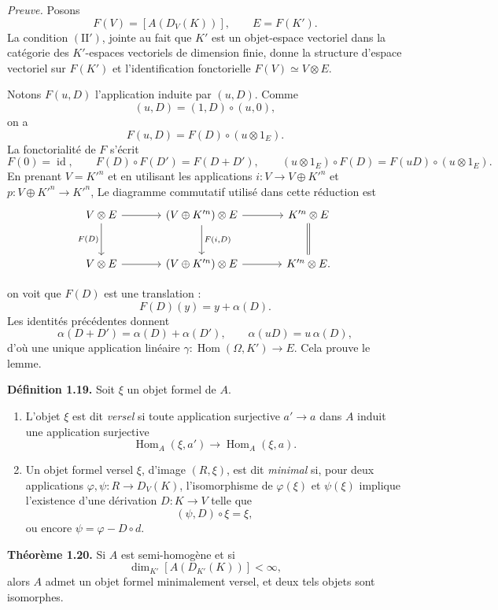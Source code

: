 \documentclass[11pt]{article}
\providecommand{\Hom}{\operatorname{Hom}}
\begin{document}
\emph{Preuve.} Posons
\[
 F(V)=[A(D_V(K))],\qquad E=F(K').
\]
La condition \((\mathrm{II}')\), jointe au fait que \(K'\) est un objet-espace vectoriel dans
la cat\'egorie des \(K'\)-espaces vectoriels de dimension finie, donne la structure d'espace
vectoriel sur \(F(K')\) et l'identification fonctorielle \(F(V)\simeq V\otimes E\).

Notons \(F(u,D)\) l'application induite par \((u,D)\). Comme
\[
 (u,D)=(1,D)\circ(u,0),
\]
on a
\[
 F(u,D)=F(D)\circ(u\otimes 1_E).
\]
La fonctorialit\'e de \(F\) s'\'ecrit
\[
 F(0)=\operatorname{id},\qquad
 F(D)\circ F(D')=F(D+D'),\qquad
 (u\otimes 1_E)\circ F(D)=F(uD)\circ(u\otimes 1_E).
\]
En prenant \(V=K'^n\) et en utilisant les applications \(i:V\to V\oplus K'^n\) et
\(p:V\oplus K'^n\to K'^n\),
Le diagramme commutatif utilis\'e dans cette r\'eduction est
\[
\begin{tikzcd}[column sep=large,row sep=large]
V\otimes E \arrow[r] \arrow[d,"F(D)"'] &
(V\oplus K'^n)\otimes E \arrow[r] \arrow[d,"{F(i,D)}"] &
K'^n\otimes E \arrow[d,equal]\\
V\otimes E \arrow[r] &
(V\oplus K'^n)\otimes E \arrow[r] &
K'^n\otimes E .
\end{tikzcd}
\]

 on voit que \(F(D)\) est une translation :
\[
 F(D)(y)=y+\alpha(D).
\]
Les identit\'es pr\'ec\'edentes donnent
\[
 \alpha(D+D')=\alpha(D)+\alpha(D'),\qquad
 \alpha(uD)=u\,\alpha(D),
\]
d'o\`u une unique application lin\'eaire
\(\gamma:\Hom(\Omega,K')\to E\). Cela prouve le lemme.

\textbf{D\'efinition 1.19.} Soit \(\xi\) un objet formel de \(A\).

\begin{enumerate}[label=(\arabic*)]
\item L'objet \(\xi\) est dit \emph{versel} si toute application surjective \(a'\to a\) dans \(A\)
induit une application surjective
\[
 \Hom_A(\xi,a')\longrightarrow \Hom_A(\xi,a).
\]
\item Un objet formel versel \(\xi\), d'image \((R,\xi)\), est dit \emph{minimal} si,
pour deux applications \(\varphi,\psi:R\to D_V(K)\), l'isomorphisme de
\(\varphi(\xi)\) et \(\psi(\xi)\) implique l'existence d'une d\'erivation \(D:K\to V\)
telle que
\[
 (\psi,D)\circ \xi=\xi,
\]
ou encore \(\psi=\varphi-D\circ d\).
\end{enumerate}

\textbf{Th\'eor\`eme 1.20.} Si \(A\) est semi-homog\`ene et si
\[
 \dim_{K'}[A(D_{K'}(K))]<\infty,
\]
alors \(A\) admet un objet formel minimalement versel, et deux tels objets sont
isomorphes.
\end{document}
